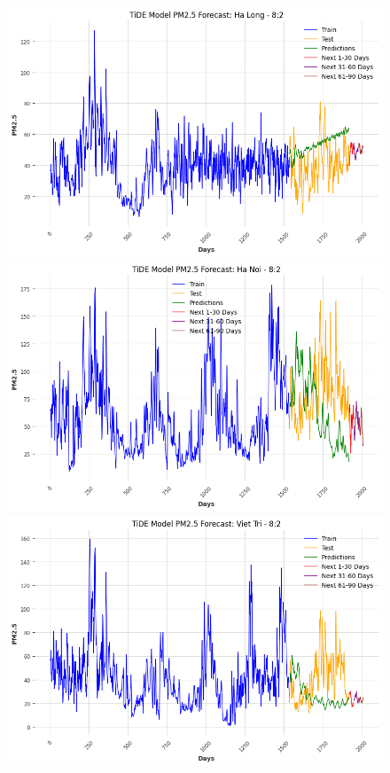\begin{figure}[H]
    \begin{minipage}{0.15\textwidth}
        \centering
        \includegraphics[width=1\textwidth]{img/final/TiDE/90D/TiDE_8_2_HL.png}
        \end{minipage}
        \hfill
        \begin{minipage}{0.15\textwidth}
        \centering
        \includegraphics[width=1\textwidth]{img/final/TiDE/90D/TiDE_8_2_HN.png}
        \end{minipage}
        \hfill
        \begin{minipage}{0.15\textwidth}
        \centering
        \includegraphics[width=1\textwidth]{img/final/TiDE/90D/TiDE_8_2_VT.png}
        \end{minipage}
        \hfill


\end{figure}
